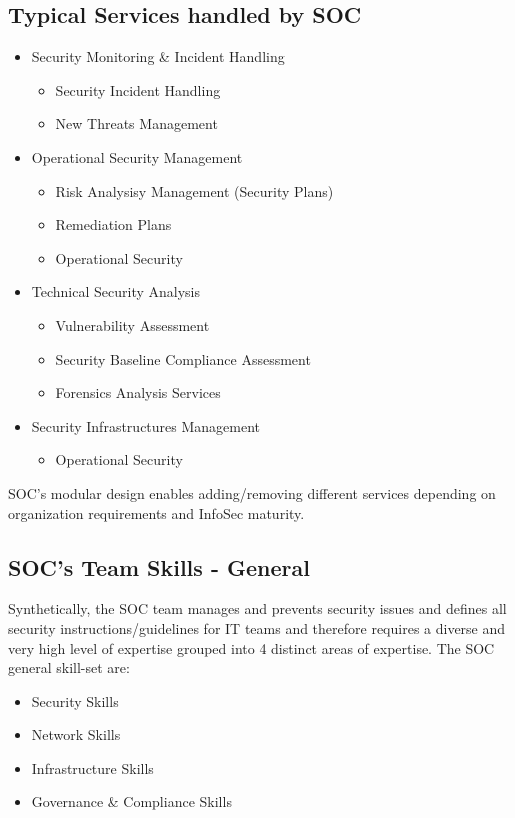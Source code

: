 \documentclass[a4]{article}
\begin{document}
\begin{multicols}{3}
\subsection{Typical Services handled by SOC}

\begin{itemize}
    \item Security Monitoring \& Incident Handling
    \begin{itemize}
        \item Security Incident Handling
        \item New Threats Management
    \end{itemize}
    \item Operational Security Management
    \begin{itemize}
        \item Risk Analysisy Management (Security Plans)
        \item Remediation Plans
        \item Operational Security
    \end{itemize}
    \item Technical Security Analysis
    \begin{itemize}
        \item Vulnerability Assessment
        \item Security Baseline Compliance Assessment
        \item Forensics Analysis Services
    \end{itemize}
    \item Security Infrastructures Management
    \begin{itemize}
        \item Operational Security
    \end{itemize}
\end{itemize}
\noindent
SOC’s modular design enables adding/removing different services depending on organization requirements and
InfoSec maturity.

\subsection{SOC's Team Skills - General}
Synthetically, the SOC team manages and prevents security issues and defines all security instructions/guidelines
for IT teams and therefore requires a diverse and very high level of expertise grouped into 4 distinct areas 
of expertise.
\noindent
The SOC general skill-set are:
\begin{itemize}
    \item Security Skills
    \item Network Skills
    \item Infrastructure Skills
    \item Governance \& Compliance Skills
\end{itemize}


\end{multicols}
\end{document}
